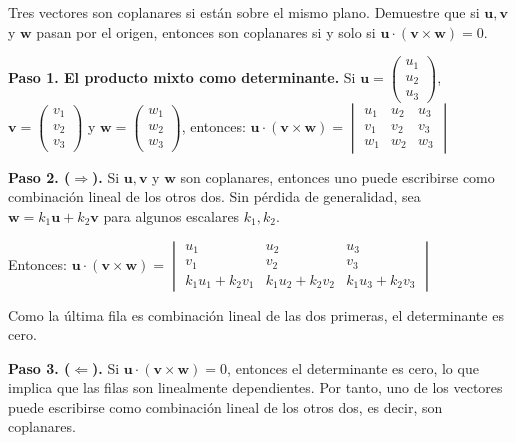 \begin{prob} Tres vectores son coplanares si están sobre el mismo plano. Demuestre que si $\mathbf{u}, \mathbf{v}$ y $\mathbf{w}$ pasan por el origen, entonces son coplanares si y solo si $\mathbf{u} \cdot (\mathbf{v} \times \mathbf{w}) = 0$.

\begin{myproof}

\textbf{Paso 1. El producto mixto como determinante.} Si $\mathbf{u}=\begin{pmatrix} u_1\\u_2\\u_3\end{pmatrix}$, $\mathbf{v}=\begin{pmatrix} v_1\\v_2\\v_3\end{pmatrix}$ y $\mathbf{w}=\begin{pmatrix} w_1\\w_2\\w_3\end{pmatrix}$, entonces: $\mathbf{u} \cdot (\mathbf{v} \times \mathbf{w})=\begin{vmatrix} u_1&u_2&u_3\\v_1&v_2&v_3\\w_1&w_2&w_3 \end{vmatrix}$

\textbf{Paso 2. ($\Rightarrow$).} Si $\mathbf{u}, \mathbf{v}$ y $\mathbf{w}$ son coplanares, entonces uno puede escribirse como combinación lineal de los otros dos. Sin pérdida de generalidad, sea $\mathbf{w}=k_1\mathbf{u}+k_2\mathbf{v}$ para algunos escalares $k_1, k_2$.

Entonces: $\mathbf{u} \cdot (\mathbf{v} \times \mathbf{w})=\begin{vmatrix}
u_1 & u_2 & u_3 \\
v_1 & v_2 & v_3 \\
k_1u_1+k_2v_1 & k_1u_2+k_2v_2 & k_1u_3+k_2v_3
\end{vmatrix}$

Como la última fila es combinación lineal de las dos primeras, el determinante es cero.

\textbf{Paso 3. ($\Leftarrow$).} Si $\mathbf{u} \cdot (\mathbf{v} \times \mathbf{w}) = 0$, entonces el determinante es cero, lo que implica que las filas son linealmente dependientes. Por tanto, uno de los vectores puede escribirse como combinación lineal de los otros dos, es decir, son coplanares.

\end{myproof}	
\end{prob}

